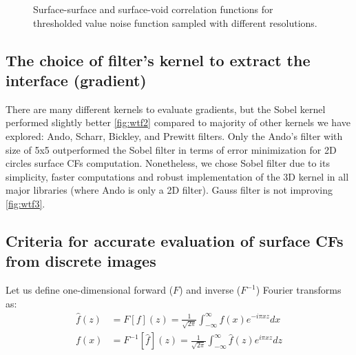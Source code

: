 \documentclass[reprint,amsmath,amssymb,aps,pre]{revtex4-1}
\begin{document}
\begin{figure}[ht]
  \centering
  \hfill
    \caption[]{Surface-surface and surface-void correlation functions for
      thresholded value noise function sampled with different resolutions.}
    \label{fig:scaling-noise}
\end{figure}

\subsection{The choice of filter’s kernel to extract the interface (gradient)}
There are many different kernels to evaluate gradients, but the Sobel kernel
performed slightly better \cref{fig:wtf2} compared to majority of other kernels
we have explored: Ando, Scharr, Bickley, and Prewitt filters. Only the Ando’s
filter with size of 5x5 \cite{ando_2000} outperformed the Sobel filter in terms
of error minimization for 2D circles surface CFs computation. Nonetheless, we
chose Sobel filter due to its simplicity, faster computations and robust
implementation of the 3D kernel in all major libraries (where Ando is only a 2D
filter). Gauss filter is not improving \cref{fig:wtf3}.

\subsection{Criteria for accurate evaluation of surface CFs from discrete images}
Let us define one-dimensional forward ($F$) and inverse ($F^{-1}$) Fourier
transforms as:
\begin{align}
  \hat{f}(z) &= F[f](z) = \frac{1}{\sqrt{2\pi}}\int_{-\infty}^{\infty} f(x)
  e^{-i\pi xz} dx \label{eq:fourier-forward} \\
  f(x) &= F^{-1}[\hat{f}](z) = \frac{1}{\sqrt{2\pi}}\int_{-\infty}^{\infty} \hat{f}(z)
  e^{i\pi xz} dz \label{eq:fourier-backward}
\end{align}
\end{document}
